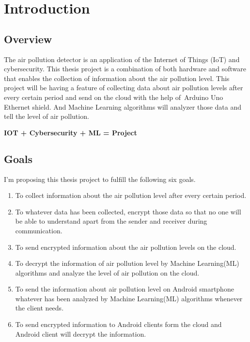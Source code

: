 
\chapter{Introduction}

\section{Overview}

The air pollution detector is an application of the Internet of Things (IoT) and cybersecurity. This thesis project is a combination of both hardware and software that enables the collection of information about the air pollution level. This project will be having a feature of collecting data about air pollution levels after every certain period and send on the cloud with the help of Arduino Uno Ethernet shield. And Machine Learning algorithms will analyzer those data and tell the level of air pollution.\\


\begin{center}
	\colorbox{green!40}{{\Huge \bfseries IOT + Cybersecurity + ML = Project}}
\end{center}



\section{Goals}

I’m proposing this thesis project to fulfill the following six goals.

\begin{enumerate}
	\item {To collect information about the air pollution level after every certain period.}
	\item {To whatever data has been collected, encrypt those data so that no one will be able to understand apart from the sender and receiver during communication.}
	\item {To send encrypted information about the air pollution levels on the cloud.}
	\item {To decrypt the information of air pollution level by Machine Learning(ML) algorithms and analyze the level of air pollution on the cloud.}
	\item {To send the information about air pollution level on Android smartphone whatever has been analyzed by Machine Learning(ML) algorithms whenever the client needs.}
	\item {To send encrypted information to Android clients form the cloud and Android client will decrypt the information.}
	
\end{enumerate}



